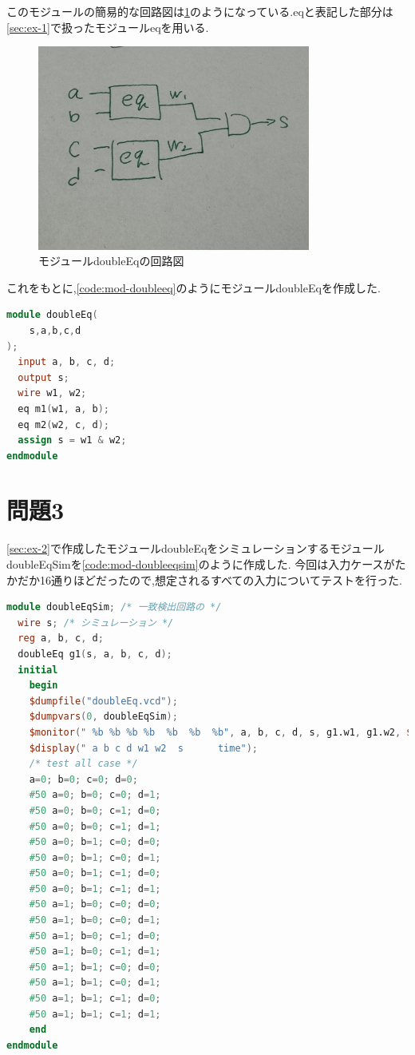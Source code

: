 \documentclass[autodetect-engine, dvi=dvipdfmx, 10pt, a4paper, ja=standard]{bxjsarticle}
\begin{document}
このモジュールの簡易的な回路図は\ref{fig:doubleEq}のようになっている.eqと表記した部分は\ref{sec:ex-1}で扱ったモジュールeqを用いる.

\begin{figure}[H]
	\centering
	\includegraphics[width=0.8\textwidth]{ex2_kairo.jpeg}
	\caption{モジュールdoubleEqの回路図}
	\label{fig:doubleEq}
\end{figure}

これをもとに,\ref{code:mod-doubleeq}のようにモジュールdoubleEqを作成した.

\begin{lstlisting}[language={Verilog}, caption={モジュールdoubleEqのVerilogコード}, label={code:mod-doubleeq}]
module doubleEq(
    s,a,b,c,d
);
  input a, b, c, d;
  output s;
  wire w1, w2;
  eq m1(w1, a, b);
  eq m2(w2, c, d);
  assign s = w1 & w2;
endmodule
\end{lstlisting}

\section{問題3}
\label{sec:ex-3}

\ref{sec:ex-2}で作成したモジュールdoubleEqをシミュレーションするモジュールdoubleEqSimを\ref{code:mod-doubleeqsim}のように作成した.
今回は入力ケースがたかだか16通りほどだったので,想定されるすべての入力についてテストを行った.

\begin{lstlisting}[language={Verilog}, caption={モジュールdoubleEqSimのVerilogコード}, label={code:mod-doubleeqsim}]
module doubleEqSim; /* 一致検出回路の */
  wire s; /* シミュレーション */
  reg a, b, c, d;
  doubleEq g1(s, a, b, c, d);
  initial
    begin
    $dumpfile("doubleEq.vcd");
    $dumpvars(0, doubleEqSim);
    $monitor(" %b %b %b %b  %b  %b  %b", a, b, c, d, s, g1.w1, g1.w2, $stime);
    $display(" a b c d w1 w2  s      time");
    /* test all case */
    a=0; b=0; c=0; d=0;
    #50 a=0; b=0; c=0; d=1;
    #50 a=0; b=0; c=1; d=0;
    #50 a=0; b=0; c=1; d=1;
    #50 a=0; b=1; c=0; d=0;
    #50 a=0; b=1; c=0; d=1;
    #50 a=0; b=1; c=1; d=0;
    #50 a=0; b=1; c=1; d=1;
    #50 a=1; b=0; c=0; d=0;
    #50 a=1; b=0; c=0; d=1;
    #50 a=1; b=0; c=1; d=0;
    #50 a=1; b=0; c=1; d=1;
    #50 a=1; b=1; c=0; d=0;
    #50 a=1; b=1; c=0; d=1;
    #50 a=1; b=1; c=1; d=0;
    #50 a=1; b=1; c=1; d=1;
    end
endmodule
\end{lstlisting}
\end{document}
